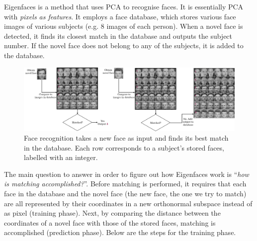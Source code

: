 \documentclass[a4paper]{article}
\begin{document}
Eigenfaces is a method that uses PCA to recognise faces. It is essentially PCA with \textit{pixels as features}. It employs a face database, which stores various face images of various subjects (e.g. 8 images of each person). When a novel face is detected, it finds its closest match in the database and outputs the subject number. If the novel face does not belong to any of the subjects, it is added to the database.
\begin{figure}[H]
    \centering
    \includegraphics[width=\linewidth]{img/matching_face_to_db.png}
    \caption{Face recognition takes a new face as input and finds its best match in the database. Each row corresponds to a subject's stored faces, labelled with an integer.}
\end{figure}
The main question to answer in order to figure out how Eigenfaces work is ``\textit{how is matching accomplished?}''. Before matching is performed, it requires that each face in the database and the novel face (the new face, the one we try to match) are all represented by their coordinates in a new orthonormal subspace instead of as pixel ({training phase}). Next, by comparing the distance between the coordinates of a novel face with those of the stored faces, matching is accomplished ({prediction phase}). Below are the steps for the training phase.
\end{document}
